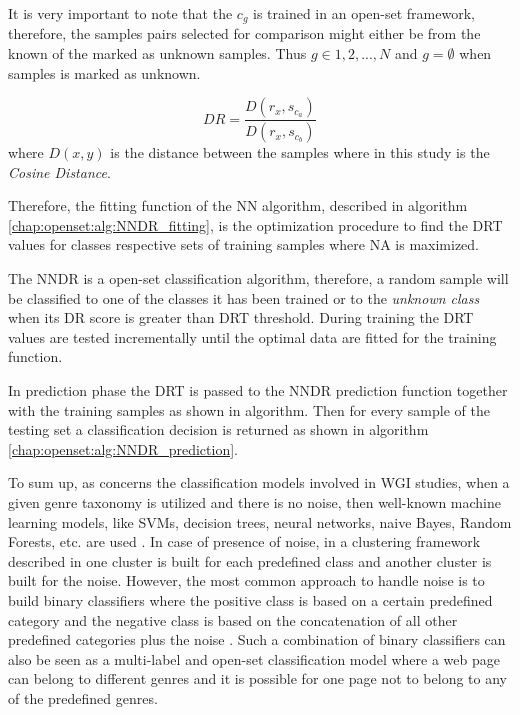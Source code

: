 It is very important to note that the $c_{g}$ is trained in an open-set framework, therefore, the samples pairs selected for comparison might either be from the known of the marked as unknown samples. Thus $g \in {1,2,...,N}$ and $g = \emptyset$ when samples is marked as unknown.

\begin{equation} \label{eq:DR}
    DR = \frac{D(r_{x}, s_{c_{a}})}{D(r_{x}, s_{c_{b}})}
\end{equation}
\noindent
where $D(x,y)$ is the distance between the samples where in this study is the \textit{Cosine Distance}.

Therefore, the fitting function of the NN algorithm, described in algorithm \ref{chap:openset:alg:NNDR_fitting}, is the optimization procedure to find the DRT values for classes respective sets of training samples where NA is maximized.

The NNDR is a open-set classification algorithm, therefore, a random sample will be classified to one of the classes it has been trained or to the \textit{unknown class} when its DR score is greater than DRT threshold. During training the DRT values are tested incrementally until the optimal data are fitted for the training function.

In prediction phase the DRT is passed to the NNDR prediction function together with the training samples as shown in algorithm. Then for every sample of the testing set a classification decision is returned as shown in algorithm \ref{chap:openset:alg:NNDR_prediction}.

To sum up, as concerns the classification models involved in WGI studies, when a given genre taxonomy is utilized and there is no noise, then well-known machine learning models, like SVMs, decision trees, neural networks, naive Bayes, Random Forests, etc. are used \parencite{Lim2005,santini2007automatic,kanaris2009learning,jebari2015combination,sharoff2010web}. In case of presence of noise, in a clustering framework described in \parencite{kennedy2005automatic} one cluster is built for each predefined class and another cluster is built for the noise. However, the most common approach to handle noise is to build binary classifiers where the positive class is based on a certain predefined category and the negative class is based on the concatenation of all other predefined categories plus the noise \parencite{kennedy2005automatic,dong2006binary,levering2008using}. Such a combination of binary classifiers can also be seen as a multi-label and open-set classification model where a web page can belong to different genres and it is possible for one page not to belong to any of the predefined genres. 

